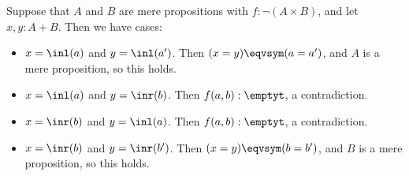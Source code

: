 \soln
Suppose that $A$ and $B$ are mere propositions with $f : \lnot (A \times B)$,
and let $x, y : A + B$.  Then we have cases:



\begin{itemize}
\item  $x = \inl(a)$ and $y = \inl(a')$.  Then $(x = y) \eqvsym (a = a')$, and $A$ is a mere proposition, so this holds.

\item  $x = \inl(a)$ and $y = \inr(b)$.  Then $f(a, b) : \emptyt$, a contradiction.

\item  $x = \inr(b)$ and $y = \inl(a)$.  Then $f(a, b) : \emptyt$, a contradiction.

\item  $x = \inr(b)$ and $y = \inr(b')$.  Then $(x = y) \eqvsym (b = b')$, and $B$ is a mere proposition, so this holds.

\end{itemize}

